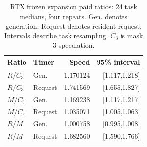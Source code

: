 \begin{table}[ht]\centering\small
\caption{RTX frozen expansion paid ratios: 24 task medians, four repeats. Gen. denotes generation; Request denotes resident request. Intervals describe task resampling. $C_3$ is mask 3 speculation.}\label{tab:rtx_cost}
\setlength{\tabcolsep}{4pt}
\begin{tabular}{@{}llrr@{}}\toprule
Ratio & Timer & Speed & 95\% interval\\\midrule
$R$/$C_3$ & Gen. & 1.170124 & [1.117,1.218]\\
$R$/$C_3$ & Request & 1.741569 & [1.655,1.827]\\
$M$/$C_3$ & Gen. & 1.169238 & [1.117,1.217]\\
$M$/$C_3$ & Request & 1.035071 & [1.005,1.063]\\
$R$/$M$ & Gen. & 1.000758 & [0.995,1.008]\\
$R$/$M$ & Request & 1.682560 & [1.590,1.766]\\
\bottomrule\end{tabular}

\end{table}
